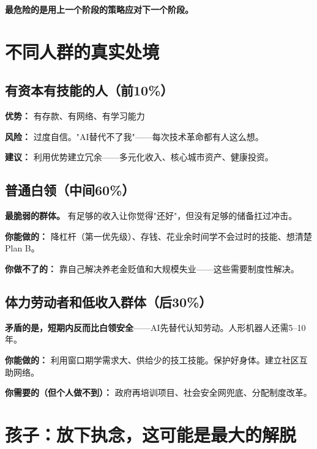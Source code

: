 \documentclass[a4paper,12pt,UTF8]{ctexart}
\begin{document}
\textbf{最危险的是用上一个阶段的策略应对下一个阶段。}

\section{不同人群的真实处境}

\subsection{有资本有技能的人（前10\%）}

\textbf{优势：} 有存款、有网络、有学习能力

\textbf{风险：} 过度自信。"AI替代不了我"——每次技术革命都有人这么想。

\textbf{建议：} 利用优势建立冗余——多元化收入、核心城市资产、健康投资。

\subsection{普通白领（中间60\%）}

\textbf{最脆弱的群体。} 有足够的收入让你觉得"还好"，但没有足够的储备扛过冲击。

\textbf{你能做的：} 降杠杆（第一优先级）、存钱、花业余时间学不会过时的技能、想清楚Plan B。

\textbf{你做不了的：} 靠自己解决养老金贬值和大规模失业——这些需要制度性解决。

\subsection{体力劳动者和低收入群体（后30\%）}

\textbf{矛盾的是，短期内反而比白领安全}——AI先替代认知劳动。人形机器人还需5--10年。

\textbf{你能做的：} 利用窗口期学需求大、供给少的技工技能。保护好身体。建立社区互助网络。

\textbf{你需要的（但个人做不到）：} 政府再培训项目、社会安全网兜底、分配制度改革。

\section{孩子：放下执念，这可能是最大的解脱}
\end{document}
